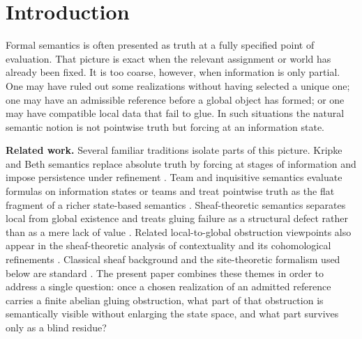 \section{Introduction}\label{sec:introduction}

Formal semantics is often presented as truth at a fully specified point of evaluation. That picture is exact when the relevant assignment or world has already been fixed. It is too coarse, however, when information is only partial. One may have ruled out some realizations without having selected a unique one; one may have an admissible reference before a global object has formed; or one may have compatible local data that fail to glue. In such situations the natural semantic notion is not pointwise truth but forcing at an information state.

\medskip
\noindent\textbf{Related work.}
Several familiar traditions isolate parts of this picture. Kripke and Beth semantics replace absolute truth by forcing at stages of information and impose persistence under refinement \cite{Beth1956,Kripke1965,TroelstraVanDalen1988}. Team and inquisitive semantics evaluate formulas on information states or teams and treat pointwise truth as the flat fragment of a richer state-based semantics \cite{Ronnholm2022,Puncochar2022,AlbertGradel2022,CiardelliGrilletti2022}. Sheaf-theoretic semantics separates local from global existence and treats gluing failure as a structural defect rather than as a mere lack of value \cite{MacLaneMoerdijk1994}. Related local-to-global obstruction viewpoints also appear in the sheaf-theoretic analysis of contextuality and its cohomological refinements \cite{AbramskyBrandenburger2011,AbramskyMansfieldBarbosa2012,AbramskyBarbosaKishidaLalMansfield2015,Caru2017}. Classical sheaf background and the site-theoretic formalism used below are standard \cite{Johnstone2002,Bredon1997,StacksProject}. The present paper combines these themes in order to address a single question: once a chosen realization of an admitted reference carries a finite abelian gluing obstruction, what part of that obstruction is semantically visible without enlarging the state space, and what part survives only as a blind residue?


